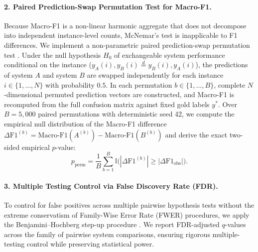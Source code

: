 \paragraph{2. Paired Prediction-Swap Permutation Test for Macro-F1.}
Because Macro-F1 is a non-linear harmonic aggregate that does not decompose into independent instance-level counts, McNemar's test is inapplicable to F1 differences. We implement a non-parametric paired prediction-swap permutation test \citep{yeh-2000-more}. Under the null hypothesis $H_0$ of exchangeable system performance conditional on the instance ($y_A(i), y_B(i) \stackrel{d}{=} y_B(i), y_A(i)$), the predictions of system $A$ and system $B$ are swapped independently for each instance $i \in \{1, \dots, N\}$ with probability $0.5$. In each permutation $b \in \{1, \dots, B\}$, complete $N$-dimensional permuted prediction vectors are constructed, and Macro-F1 is recomputed from the full confusion matrix against fixed gold labels $y^*$. Over $B = 5,000$ paired permutations with deterministic seed 42, we compute the empirical null distribution of the Macro-F1 difference $\Delta \text{F1}^{(b)} = \text{Macro-F1}(A^{(b)}) - \text{Macro-F1}(B^{(b)})$ and derive the exact two-sided empirical $p$-value:
\begin{equation}
    p_{\text{perm}} = \frac{1}{B} \sum_{b=1}^B \mathbb{I}\Big(|\Delta \text{F1}^{(b)}| \ge |\Delta \text{F1}_{\text{obs}}|\Big).
\end{equation}

\paragraph{3. Multiple Testing Control via False Discovery Rate (FDR).}
To control for false positives across multiple pairwise hypothesis tests without the extreme conservatism of Family-Wise Error Rate (FWER) procedures, we apply the Benjamini--Hochberg step-up procedure \citep{benjamini-hochberg-1995}. We report FDR-adjusted $q$-values across the family of pairwise system comparisons, ensuring rigorous multiple-testing control while preserving statistical power.
